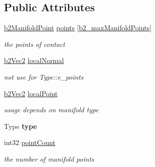 \subsection*{Public Attributes}
\begin{DoxyCompactItemize}
\item 
\mbox{\label{structb2Manifold_acd82a1b1a8dd2b9fcfa75f0c22f8d092}} 
\hyperlink{structb2ManifoldPoint}{b2\+Manifold\+Point} \hyperlink{structb2Manifold_acd82a1b1a8dd2b9fcfa75f0c22f8d092}{points} \mbox{[}\hyperlink{_2cocos2d_2external_2Box2D_2include_2Box2D_2Common_2b2Settings_8h_aa5f44cc9edf711433dea2b2ec94f3c42}{b2\+\_\+max\+Manifold\+Points}\mbox{]}
\begin{DoxyCompactList}\small\item\em the points of contact \end{DoxyCompactList}\item 
\mbox{\label{structb2Manifold_a3604e9fef2a03347c5649c71a9fd4c79}} 
\hyperlink{structb2Vec2}{b2\+Vec2} \hyperlink{structb2Manifold_a3604e9fef2a03347c5649c71a9fd4c79}{local\+Normal}
\begin{DoxyCompactList}\small\item\em not use for Type\+::e\+\_\+points \end{DoxyCompactList}\item 
\mbox{\label{structb2Manifold_a8825cea31b27dbbaf22c13c3070870d5}} 
\hyperlink{structb2Vec2}{b2\+Vec2} \hyperlink{structb2Manifold_a8825cea31b27dbbaf22c13c3070870d5}{local\+Point}
\begin{DoxyCompactList}\small\item\em usage depends on manifold type \end{DoxyCompactList}\item 
\mbox{\label{structb2Manifold_a4cb6ceba7105513b1e5bd6dbf0cce168}} 
Type {\bfseries type}
\item 
\mbox{\label{structb2Manifold_abf59ff6fa36bed34b0242ad54951a696}} 
int32 \hyperlink{structb2Manifold_abf59ff6fa36bed34b0242ad54951a696}{point\+Count}
\begin{DoxyCompactList}\small\item\em the number of manifold points \end{DoxyCompactList}\end{DoxyCompactItemize}


